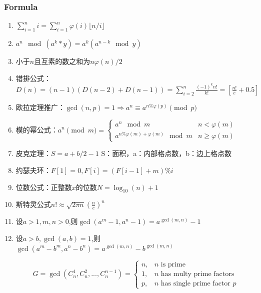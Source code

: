 \documentclass[twoside]{article}
\begin{document}
\subsubsection{Formula}
\begin{enumerate}

\item $\sum_{i=1}^n i=\sum_{i=1}^n\varphi(i)\lfloor n/i\rfloor$

\item $a^n\mod(a^k*y)=a^k(a^{n-k}\mod y)$

\item 小于$n$且互素的数之和为$n\varphi(n)/2$

\item 错排公式：$D(n)=(n-1)(D(n-2)+D(n-1))=\sum_{i=2}^n\frac{(-1)^kn!}{k!}=[\frac{n!}{e}+0.5]$

\item 欧拉定理推广：$\gcd(n,p)=1\Rightarrow a^n\equiv a^{n\%\varphi(p)}\pmod p$

\item 模的幂公式：$a ^ n \pmod {m} = 
\begin{cases}
a ^ n \mod m & n < \varphi(m)\\
a ^ {n \% \varphi(m) + \varphi(m)} \mod m & n \ge \varphi(m)
\end{cases}
$

\item 皮克定理：$S=a+b/2-1$ S：面积，a：内部格点数，b：边上格点数

\item 约瑟夫环：$F[1]=0,F[i]=(F[i-1]+m)\% i$

\item 位数公式：正整数$x$的位数$N=\log_{10}(n)+1$

\item 斯特灵公式$n!\approx\sqrt{2\pi n}(\frac{n}{e})^n$

\item 设$a>1,m,n>0$,则$\gcd(a^m-1,a^n-1)=a^{\gcd(m,n)}-1$

\item 设$a>b,\gcd(a,b)=1$,则$\gcd(a^m-b^m,a^n-b^n)=a^{\gcd(m,n)}-b^{\gcd(m,n)}$

$$
G=\gcd(C_n^1,C_n^2,...,C_n^{n-1})=
\begin{cases}
	n, & \text{$n$ is prime} \\
	1, & \text{$n$ has multy prime factors} \\
	p, & \text{$n$ has single prime factor $p$}
\end{cases}
$$


\end{enumerate}
\end{document}

